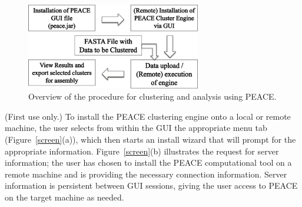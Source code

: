 \documentclass[a4,center,fleqn]{NAR}
\newcommand{\peace} {{\small PEACE}}
\begin{document}
\begin{figure}
  \centerline{\includegraphics[width=3in]{pics.d/workflow.png}}
  \caption{Overview of the procedure for clustering and analysis using
    PEACE.}\label{fig:workflow}
\end{figure}


 (First use only.) To install the
\peace\/ clustering engine onto a local or remote machine, the user selects
from within the GUI the appropriate menu tab (Figure~\ref{screen}(a)),
which then starts an install wizard that will prompt for the
appropriate information.  Figure~\ref{screen}(b) illustrates the
request for server information; the user has chosen to install the
\peace\/ computational tool on a remote machine and is providing
the necessary connection information.  Server information is
persistent between GUI sessions, giving the user access to \peace\/
on the target machine as needed.
\end{document}
